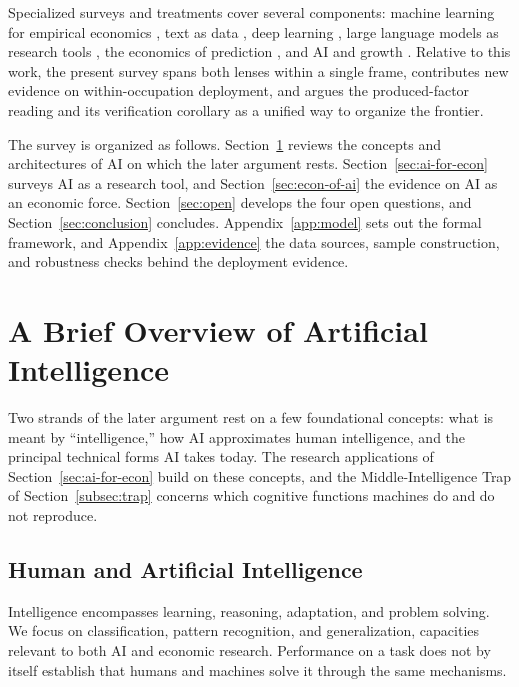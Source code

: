 \documentclass[12pt]{article}
\theoremstyle{plain}
\theoremstyle{definition}
\theoremstyle{remark}
\begin{document}
Specialized surveys and treatments cover several components:
machine learning for empirical economics \citep{MullainathanSpiess2017,
AtheyImbens2019}, text as data \citep{GentzkowKellyTaddy2019}, deep
learning \citep{Dell2025}, large language models as research tools
\citep{Korinek2023}, the economics of
prediction \citep{AgrawalGansGoldfarb2022}, and AI and growth
\citep{AghionJonesJones2019, Acemoglu2024SimpleMacroAI}. Relative to
this work, the present survey spans both lenses within a single frame,
contributes new evidence on
within-occupation deployment, and argues the produced-factor reading and
its verification corollary as a unified way to organize the frontier.

The survey is organized as follows. Section~\ref{sec:ai-overview} reviews
the concepts and architectures of AI on which the later argument rests.
Section~\ref{sec:ai-for-econ} surveys AI as a research tool, and
Section~\ref{sec:econ-of-ai} the evidence on AI as an economic force.
Section~\ref{sec:open} develops the four open questions, and
Section~\ref{sec:conclusion} concludes. Appendix~\ref{app:model} sets out
the formal framework, and Appendix~\ref{app:evidence} the data sources,
sample construction, and robustness checks behind the deployment
evidence.

\section{A Brief Overview of Artificial Intelligence}\label{sec:ai-overview}

Two strands of the later argument rest on a few foundational concepts:
what is meant by ``intelligence,'' how AI approximates human
intelligence, and the principal technical forms AI takes today. The
research applications of Section~\ref{sec:ai-for-econ} build on these
concepts, and the Middle-Intelligence Trap of Section~\ref{subsec:trap} concerns which cognitive functions machines do and do not reproduce.

\subsection{Human and Artificial Intelligence}\label{subsec:human-intelligence}

Intelligence encompasses learning, reasoning, adaptation, and
problem solving. We focus on classification, pattern recognition, and
generalization, capacities relevant to both AI and economic research.
Performance on a task does not by itself establish that humans and
machines solve it through the same mechanisms.
\end{document}
